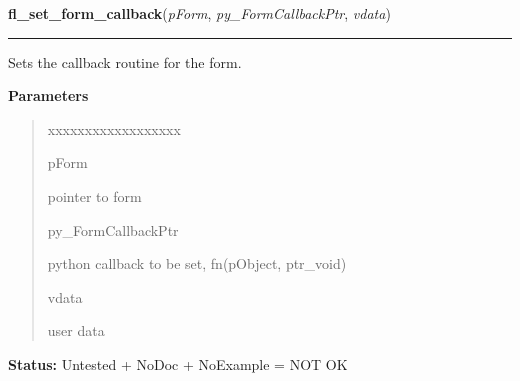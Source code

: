     \vspace{0.5ex}

\hspace{.8\funcindent}\begin{boxedminipage}{\funcwidth}

    \raggedright \textbf{fl\_set\_form\_callback}(\textit{pForm}, \textit{py\_FormCallbackPtr}, \textit{vdata})

    \vspace{-1.5ex}

    \rule{\textwidth}{0.5\fboxrule}
\setlength{\parskip}{2ex}
    Sets the callback routine for the form.

\setlength{\parskip}{1ex}
      \textbf{Parameters}
      \vspace{-1ex}

      \begin{quote}
        \begin{Ventry}{xxxxxxxxxxxxxxxxxx}

          \item[pForm]

          pointer to form

          \item[py\_FormCallbackPtr]

          python callback to be set, fn(pObject, ptr\_void)

          \item[vdata]

          user data

        \end{Ventry}

      \end{quote}

\textbf{Status:} Untested + NoDoc + NoExample = NOT OK



    \end{boxedminipage}

    \label{xformslib:library:fl_set_form_callback}

    \vspace{0.5ex}

